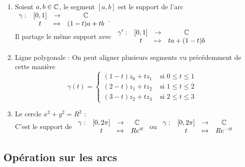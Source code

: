 \documentclass[]{report}
\begin{document}
\begin{enumerate}
    \item Soient $a,b\in\mathbb{C}$, le segment $[a,b]$ est le support de l'arc $\begin{array}{ccccc}
\gamma : & [0,1] & \to & \mathbb{C} \\
  & t & \mapsto & (1-t)a+tb  
\end{array}$.\\
Il partage le même support avec $\begin{array}{ccccc}
\gamma' : & [0,1] & \to & \mathbb{C} \\
  & t & \mapsto & ta+(1-t)b
\end{array}$
    \item Ligne polygonale : On peut aligner plusieurs segments vu précédemment de cette manière $$\gamma(t)=\left\{\begin{array}{ll}
 (1-t)z_0+tz_1 & \text{ si } 0 \le t \le 1\\
 (2-t)z_1+tz_2 & \text{ si } 1 \le t \le 2\\
 (3-t)z_2+tz_3 & \text{ si } 2 \le t \le 3
 \end{array}\right.$$
    \item Le cercle $x^2+y^2=R^2$ :\\
    C'est le support de $\begin{array}{ccccc}
\gamma : & [0,2\pi] & \to & \mathbb{C} \\
  & t & \mapsto & Re^{it}  
\end{array}$ ou $\begin{array}{ccccc}
\gamma : & [0,2\pi] & \to & \mathbb{C} \\
  & t & \mapsto & Re^{-it}
\end{array}$
\end{enumerate}

\subsection{Opération sur les arcs}
\end{document}
